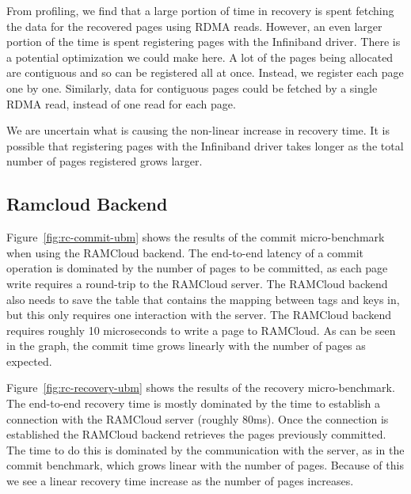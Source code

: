 From profiling, we find that a large portion of time in recovery is spent
fetching the data for the recovered pages using RDMA reads. However, an even
larger portion of the time is spent registering pages with the Infiniband
driver. There is a potential optimization we could make here. A lot of the
pages being allocated are contiguous and so can be registered all at once.
Instead, we register each page one by one. Similarly, data for contiguous
pages could be fetched by a single RDMA read, instead of one read for each page.

We are uncertain what is causing the non-linear increase in recovery time.
It is possible that registering pages with the Infiniband driver takes
longer as the total number of pages registered grows larger.

\subsection{Ramcloud Backend}

Figure~\ref{fig:rc-commit-ubm} shows the results of the commit micro-benchmark
when using the RAMCloud backend.  The end-to-end latency of a commit operation
is dominated by the number of pages to be committed, as each page write
requires a round-trip to the RAMCloud server.  The RAMCloud backend also needs
to save the table that contains the mapping between tags and keys in, but this
only requires one interaction with the server.  The RAMCloud backend requires
roughly 10 microseconds to write a page to RAMCloud. As can be seen in the
graph, the commit time grows linearly with the number of pages as expected.

Figure~\ref{fig:rc-recovery-ubm} shows the results of the recovery
micro-benchmark.  The end-to-end recovery time is mostly dominated by the time
to establish a connection with the RAMCloud server (roughly 80ms).  Once the
connection is established the RAMCloud backend retrieves the pages previously
committed. The time to do this is dominated by the communication with the
server, as in the commit benchmark, which grows linear with the number of
pages.  Because of this we see a linear recovery time increase as the number of
pages increases.

